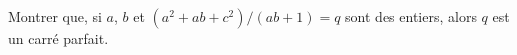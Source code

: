 Montrer que, si $a$, $b$ et $(a^2 + ab + c^2)/(ab + 1) = q$ sont des entiers, alors $q$ est un carré parfait.
